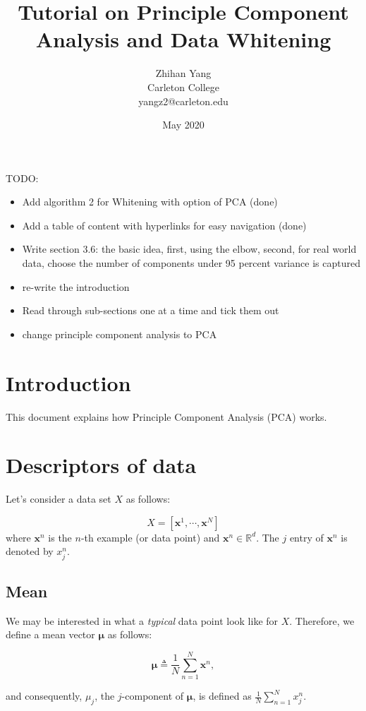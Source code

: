 \documentclass{article}
\title{Tutorial on Principle Component Analysis and Data Whitening}
\author{Zhihan Yang \\ Carleton College \\ yangz2@carleton.edu}
\date{May 2020}
\newcommand{\vecx}{\boldsymbol{x}}
\begin{document}
\maketitle

\tableofcontents

TODO:

\begin{itemize}
	\item Add algorithm 2 for Whitening with option of PCA (done)
	\item Add a table of content with hyperlinks for easy navigation (done)
	\item Write section 3.6: the basic idea, first, using the elbow, second, for real world data, choose the number of components under 95 percent variance is captured
	\item re-write the introduction
	\item Read through sub-sections one at a time and tick them out
	\item change principle component analysis to PCA
\end{itemize}

\section{Introduction}

This document explains how Principle Component Analysis (PCA) works. 

\section{Descriptors of data}
Let's consider a data set $X$ as follows:

$$X =  [\vecx^1, \cdots, \vecx^N] $$ where $\vecx^n$ is the $n$-th example (or data point) and $\vecx^n \in \mathds{R}^d$. The $j$ entry of $\vecx^n$ is denoted by $x^n_j$.

\subsection{Mean}

We may be interested in what a \textit{typical} data point look like for $X$. Therefore, we define a mean vector $\boldsymbol{\mu}$ as follows:

$$\boldsymbol{\mu} \triangleq \frac{1}{N} \sum_{n=1}^N \vecx^n, $$ 

and consequently, $\mu_j$, the $j$-component of $\boldsymbol{\mu}$, is defined as $ \frac{1}{N} \sum_{n=1}^N x^n_j$.
\end{document}
